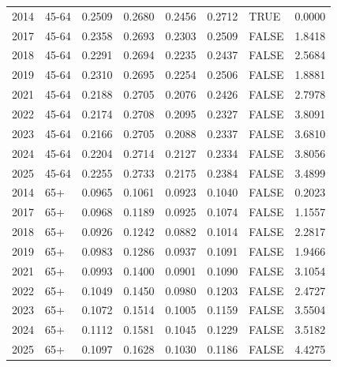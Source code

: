 \begin{longtable}{rlrrrrlr}
2014 & 45-64 & 0.2509 & 0.2680 & 0.2456 & 0.2712 & TRUE & 0.0000 \\
2017 & 45-64 & 0.2358 & 0.2693 & 0.2303 & 0.2509 & FALSE & 1.8418 \\
2018 & 45-64 & 0.2291 & 0.2694 & 0.2235 & 0.2437 & FALSE & 2.5684 \\
2019 & 45-64 & 0.2310 & 0.2695 & 0.2254 & 0.2506 & FALSE & 1.8881 \\
2021 & 45-64 & 0.2188 & 0.2705 & 0.2076 & 0.2426 & FALSE & 2.7978 \\
2022 & 45-64 & 0.2174 & 0.2708 & 0.2095 & 0.2327 & FALSE & 3.8091 \\
2023 & 45-64 & 0.2166 & 0.2705 & 0.2088 & 0.2337 & FALSE & 3.6810 \\
2024 & 45-64 & 0.2204 & 0.2714 & 0.2127 & 0.2334 & FALSE & 3.8056 \\
2025 & 45-64 & 0.2255 & 0.2733 & 0.2175 & 0.2384 & FALSE & 3.4899 \\
2014 & 65+ & 0.0965 & 0.1061 & 0.0923 & 0.1040 & FALSE & 0.2023 \\
2017 & 65+ & 0.0968 & 0.1189 & 0.0925 & 0.1074 & FALSE & 1.1557 \\
2018 & 65+ & 0.0926 & 0.1242 & 0.0882 & 0.1014 & FALSE & 2.2817 \\
2019 & 65+ & 0.0983 & 0.1286 & 0.0937 & 0.1091 & FALSE & 1.9466 \\
2021 & 65+ & 0.0993 & 0.1400 & 0.0901 & 0.1090 & FALSE & 3.1054 \\
2022 & 65+ & 0.1049 & 0.1450 & 0.0980 & 0.1203 & FALSE & 2.4727 \\
2023 & 65+ & 0.1072 & 0.1514 & 0.1005 & 0.1159 & FALSE & 3.5504 \\
2024 & 65+ & 0.1112 & 0.1581 & 0.1045 & 0.1229 & FALSE & 3.5182 \\
2025 & 65+ & 0.1097 & 0.1628 & 0.1030 & 0.1186 & FALSE & 4.4275 \\
\end{longtable}
\normalsize
